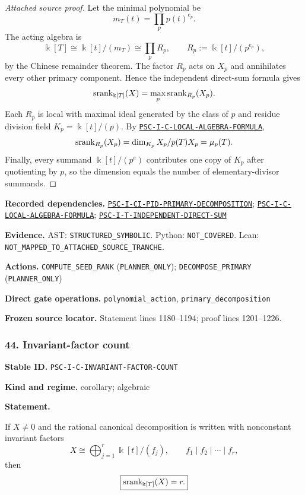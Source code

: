 \documentclass[a4paper,11pt]{article}
\newcommand{\bbk}{\Bbbk}\newcommand{\A}{\mathcal A}\newcommand{\B}{\mathcal B}\newcommand{\Ccal}{\mathcal C}\newcommand{\Pcal}{\mathcal P}\newcommand{\Qcal}{\mathcal Q}\newcommand{\Rcal}{\mathcal R}\newcommand{\Scal}{\mathcal S}
\newcommand{\field}[2]{\noindent\textbf{#1.} #2\par}
\begin{document}
\begin{proof}[Attached source proof]
Let the minimal polynomial be
\[
m_T(t)=\prod_{p}p(t)^{e_p}.
\]
The acting algebra is
\[
\bbk[T]\cong\bbk[t]/(m_T)
\cong\prod_pR_p,
\qquad
R_p:=\bbk[t]/(p^{e_p}),
\]
by the Chinese remainder theorem.  The factor $R_p$ acts on $X_p$ and annihilates every other primary component.  Hence the independent direct-sum formula gives
\[
\srank_{\bbk[T]}(X)=\max_p\srank_{R_p}(X_p).
\]
Each $R_p$ is local with maximal ideal generated by the class of $p$ and residue division field $K_p=\bbk[t]/(p)$.  By \hyperref[rec:PSC-I-C-LOCAL-ALGEBRA-FORMULA]{\nolinkurl{PSC-I-C-LOCAL-ALGEBRA-FORMULA}},
\[
\operatorname{srank}_{R_p}(X_p)
=
\dim_{K_p}X_p/p(T)X_p
=
\mu_p(T).
\]
Finally, every summand $\bbk[t]/(p^e)$ contributes one copy of $K_p$ after quotienting by $p$, so the dimension equals the number of elementary-divisor summands.
\end{proof}
\field{Recorded dependencies}{\hyperref[rec:PSC-I-CI-PID-PRIMARY-DECOMPOSITION]{\nolinkurl{PSC-I-CI-PID-PRIMARY-DECOMPOSITION}}; \hyperref[rec:PSC-I-C-LOCAL-ALGEBRA-FORMULA]{\nolinkurl{PSC-I-C-LOCAL-ALGEBRA-FORMULA}}; \hyperref[rec:PSC-I-T-INDEPENDENT-DIRECT-SUM]{\nolinkurl{PSC-I-T-INDEPENDENT-DIRECT-SUM}}}
\field{Evidence}{AST: \nolinkurl{STRUCTURED_SYMBOLIC}. Python: \nolinkurl{NOT_COVERED}. Lean: \nolinkurl{NOT_MAPPED_TO_ATTACHED_SOURCE_TRANCHE}.}
\field{Actions}{\nolinkurl{COMPUTE_SEED_RANK} (\nolinkurl{PLANNER_ONLY}); \nolinkurl{DECOMPOSE_PRIMARY} (\nolinkurl{PLANNER_ONLY})}
\field{Direct gate operations}{\nolinkurl{polynomial_action}, \nolinkurl{primary_decomposition}}
\field{Frozen source locator}{Statement lines 1180--1194; proof lines 1201--1226.}
\subsubsection*{44. Invariant-factor count}
\label{rec:PSC-I-C-INVARIANT-FACTOR-COUNT}
\field{Stable ID}{\nolinkurl{PSC-I-C-INVARIANT-FACTOR-COUNT}}
\field{Kind and regime}{corollary; algebraic}
\textbf{Statement.}\par
If $X\neq0$ and the rational canonical decomposition is written with nonconstant invariant factors
\[
X\cong\bigoplus_{j=1}^{r}\bbk[t]/(f_j),
\qquad
f_1\mid f_2\mid\cdots\mid f_r,
\]
then
\[
\boxed{\srank_{\bbk[T]}(X)=r.}
\]
\end{document}
